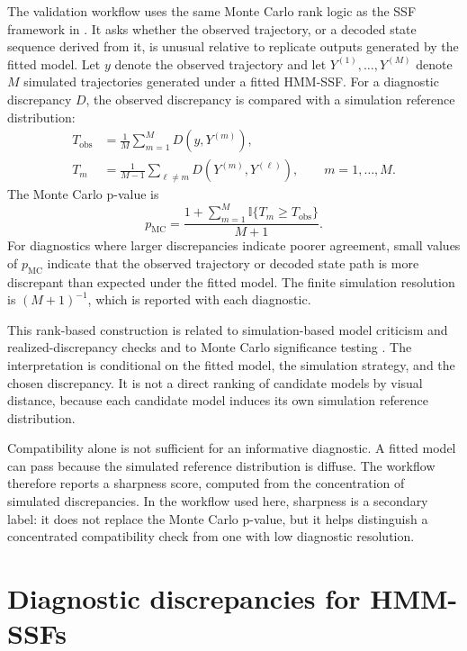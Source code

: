 \documentclass[11pt]{article}
\newcommand{\ind}{\mathbb{I}}
\newcommand{\mcP}{p_{\mathrm{MC}}}
\begin{document}
The validation workflow uses the same Monte Carlo rank logic as the SSF
framework in \citet{nicosia2026}. It asks whether the observed trajectory, or a
decoded state sequence derived from it, is unusual relative to replicate
outputs generated by the fitted model. Let $y$ denote the observed trajectory
and let $Y^{(1)},\ldots,Y^{(M)}$ denote $M$ simulated trajectories generated
under a fitted HMM-SSF. For a diagnostic discrepancy $D$, the observed
discrepancy is compared with a simulation reference distribution:
\begin{align*}
  T_{\mathrm{obs}}
  &=
  \frac{1}{M}\sum_{m=1}^{M} D(y, Y^{(m)}), \\
  T_m
  &=
  \frac{1}{M-1}\sum_{\ell \ne m} D(Y^{(m)}, Y^{(\ell)}),
  \qquad m=1,\ldots,M .
\end{align*}
The Monte Carlo p-value is
\begin{equation*}
  \mcP =
  \frac{1 + \sum_{m=1}^{M} \ind\{T_m \ge T_{\mathrm{obs}}\}}
       {M+1}.
\end{equation*}
For diagnostics where larger discrepancies indicate poorer agreement, small
values of $\mcP$ indicate that the observed trajectory or decoded state path is
more discrepant than expected under the fitted model. The finite simulation
resolution is $(M+1)^{-1}$, which is reported with each diagnostic.

This rank-based construction is related to simulation-based model criticism and
realized-discrepancy checks \citep{gelman1996} and to Monte Carlo significance
testing \citep{besag1989}. The interpretation is conditional on the fitted
model, the simulation strategy, and the chosen discrepancy. It is not a direct
ranking of candidate models by visual distance, because each candidate model
induces its own simulation reference distribution.

Compatibility alone is not sufficient for an informative diagnostic. A fitted
model can pass because the simulated reference distribution is diffuse. The
workflow therefore reports a sharpness score, computed from the concentration
of simulated discrepancies. In the workflow used here, sharpness is a
secondary label: it does not replace the Monte Carlo p-value, but it helps
distinguish a concentrated compatibility check from one with low diagnostic
resolution.

\section{Diagnostic discrepancies for HMM-SSFs}
\end{document}
